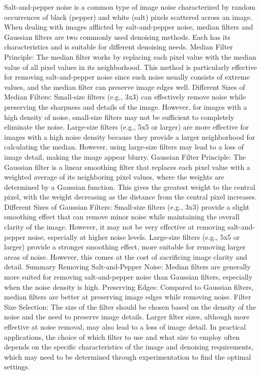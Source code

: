Salt-and-pepper noise is a common type of image noise characterized by random occurrences of black (pepper) and white (salt) pixels scattered across an image. When dealing with images afflicted by salt-and-pepper noise, median filters and Gaussian filters are two commonly used denoising methods. Each has its characteristics and is suitable for different denoising needs.
Median Filter
Principle: The median filter works by replacing each pixel value with the median value of all pixel values in its neighborhood. This method is particularly effective for removing salt-and-pepper noise since such noise usually consists of extreme values, and the median filter can preserve image edges well.
Different Sizes of Median Filters:
Small-size filters (e.g., 3x3) can effectively remove noise while preserving the sharpness and details of the image. However, for images with a high density of noise, small-size filters may not be sufficient to completely eliminate the noise.
Large-size filters (e.g., 5x5 or larger) are more effective for images with a high noise density because they provide a larger neighborhood for calculating the median. However, using large-size filters may lead to a loss of image detail, making the image appear blurry.
Gaussian Filter
Principle: The Gaussian filter is a linear smoothing filter that replaces each pixel value with a weighted average of its neighboring pixel values, where the weights are determined by a Gaussian function. This gives the greatest weight to the central pixel, with the weight decreasing as the distance from the central pixel increases.
Different Sizes of Gaussian Filters:
Small-size filters (e.g., 3x3) provide a slight smoothing effect that can remove minor noise while maintaining the overall clarity of the image. However, it may not be very effective at removing salt-and-pepper noise, especially at higher noise levels.
Large-size filters (e.g., 5x5 or larger) provide a stronger smoothing effect, more suitable for removing larger areas of noise. However, this comes at the cost of sacrificing image clarity and detail.
Summary
Removing Salt-and-Pepper Noise: Median filters are generally more suited for removing salt-and-pepper noise than Gaussian filters, especially when the noise density is high.
Preserving Edges: Compared to Gaussian filters, median filters are better at preserving image edges while removing noise.
Filter Size Selection: The size of the filter should be chosen based on the density of the noise and the need to preserve image details. Larger filter sizes, although more effective at noise removal, may also lead to a loss of image detail.
In practical applications, the choice of which filter to use and what size to employ often depends on the specific characteristics of the image and denoising requirements, which may need to be determined through experimentation to find the optimal settings.